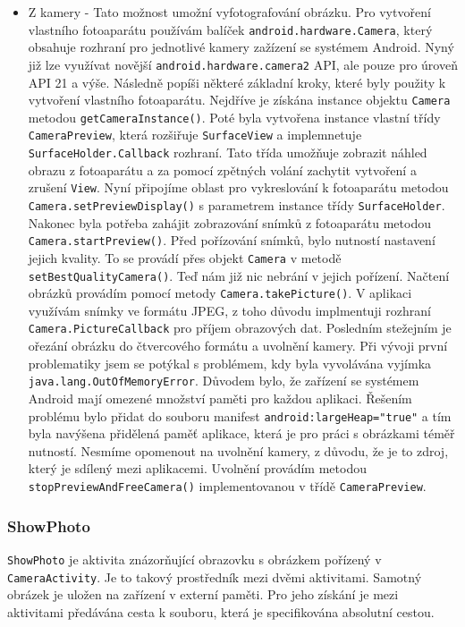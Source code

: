 \documentclass[12pt]{article}
\begin{document}
\begin{itemize}
\item Z kamery - Tato možnost umožní vyfotografování obrázku. Pro vytvoření vlastního fotoaparátu používám balíček \verb+android.hardware.Camera+, který obsahuje rozhraní pro jednotlivé kamery zažízení se systémem Android. Nyný již lze využívat novější \verb+android.hardware.camera2+ API, ale pouze pro úroveň API 21 a výše. Následně popíši některé základní kroky, které byly použity k vytvoření vlastního fotoaparátu. Nejdříve je získána instance objektu \verb+Camera+ metodou \verb+getCameraInstance()+. Poté byla vytvořena instance vlastní třídy \verb+CameraPreview+, která rozšiřuje \verb+SurfaceView+ a implemnetuje \verb+SurfaceHolder.Callback+ rozhraní. Tato třída umožňuje zobrazit náhled obrazu z fotoaparátu a za pomocí zpětných volání zachytit vytvoření a zrušení \verb+View+. Nyní připojíme oblast pro vykreslování k fotoaparátu metodou \verb+Camera.setPreviewDisplay()+ s parametrem instance třídy \verb+SurfaceHolder+. Nakonec byla potřeba zahájit zobrazování snímků z fotoaparátu metodou \verb+Camera.startPreview()+. Před pořízování snímků, bylo nutností nastavení jejich kvality. To se provádí přes objekt \verb+Camera+ v metodě \verb+setBestQualityCamera()+. Teď nám již nic nebrání v jejich pořízení. Načtení obrázků provádím pomocí metody \verb+Camera.takePicture()+. V aplikaci využívám snímky ve formátu JPEG, z toho důvodu implmentuji rozhraní \verb+Camera.PictureCallback+ pro příjem obrazových dat. Posledním stežejním je ořezání obrázku do čtvercového formátu a uvolnění kamery. Při vývoji první problematiky jsem se potýkal s problémem, kdy byla vyvolávána vyjímka \verb+java.lang.OutOfMemoryError+. Důvodem bylo, že zařízení se systémem Android mají omezené množství paměti pro každou aplikaci. Řešením problému bylo přidat do souboru manifest \verb+android:largeHeap="true"+ a tím byla navýšena přidělená paměť aplikace, která je pro práci s obrázkami téměř nutností. Nesmíme opomenout na uvolnění kamery, z důvodu, že je to zdroj, který je sdílený mezi aplikacemi. Uvolnění provádím metodou \verb+stopPreviewAndFreeCamera()+ implementovanou v třídě \verb+CameraPreview+.\cite{camera}
\end{itemize}
\subsubsection{ShowPhoto}
\verb+ShowPhoto+ je aktivita znázorňující obrazovku s obrázkem pořízený v \verb+CameraActivity+. Je to takový prostředník mezi dvěmi aktivitami. Samotný obrázek je uložen na zařízení v externí paměti. Pro jeho získání je mezi aktivitami předávána cesta k souboru, která je specifikována absolutní cestou.
\end{document}
